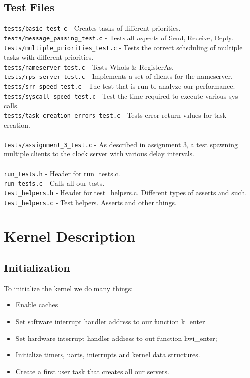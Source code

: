 \documentclass[letterpaper]{article}
\begin{document}
\subsection{Test Files}
\verb!tests/basic_test.c! - Creates tasks of different priorities.\\
\verb!tests/message_passing_test.c! - Tests all aspects of Send, Receive, Reply.\\
\verb!tests/multiple_priorities_test.c! - Tests the correct scheduling of multiple tasks with different priorities.\\
\verb!tests/nameserver_test.c! - Tests WhoIs \& RegisterAs.\\
\verb!tests/rps_server_test.c! - Implements a set of clients for the nameserver.\\
\verb!tests/srr_speed_test.c! - The test that is run to analyze our performance.\\
\verb!tests/syscall_speed_test.c! - Test the time required to execute various sys calls.\\
\verb!tests/task_creation_errors_test.c! - Tests error return values for task creation.\\
\\
\verb!tests/assignment_3_test.c! - As described in assignment 3, a test spawning multiple clients to the clock server with various delay intervals.\\
\\
\verb!run_tests.h! - Header for run\_tests.c.\\
\verb!run_tests.c! - Calls all our tests.\\
\verb!test_helpers.h! - Header for test\_helpers.c. Different types of asserts and such.\\
\verb!test_helpers.c! - Test helpers. Asserts and other things.

\section{Kernel Description}

\subsection{Initialization}

To initialize the kernel we do many things:
\begin{itemize}
  \item Enable caches
  \item Set software interrupt handler address to our function k\_enter
  \item Set hardware interrupt handler address to out function hwi\_enter;
  \item Initialize timers, uarts, interrupts and kernel data structures.
  \item Create a first user task that creates all our servers.
\end{itemize}
\end{document}
